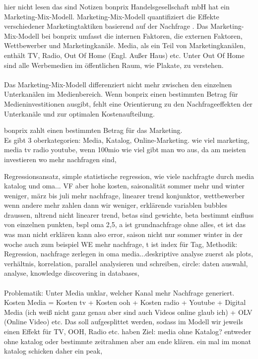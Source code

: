 \iffalse
hier nicht lesen das sind Notizen
bonprix Handelsgesellschaft mbH hat ein Marketing-Mix-Modell. Marketing-Mix-Modell quantifiziert die Effekte verschiedener Marketingtaktiken basierend auf der Nachfrage \cite{MMMdef}. Das Marketing-Mix-Modell bei bonprix umfasst die internen Faktoren, die externen Faktoren, Wettbewerber und Marketingkanäle. Media, als ein Teil von Marketingkanälen, enthält TV, Radio, Out Of Home (Engl. Außer Haus) etc. Unter Out Of Home sind alle Werbemedien im öffentlichen Raum, wie Plakate, zu verstehen. \\\\
Das Marketing-Mix-Modell differenziert nicht mehr zwischen den einzelnen Unterkanälen im Medienbereich. Wenn bonprix einen bestimmten Betrag für Medieninvestitionen ausgibt, fehlt eine Orientierung zu den Nachfrageeffekten der Unterkanäle und zur optimalen Kostenaufteilung.

bonprix zahlt einen bestimmten Betrag für das Marketing. \\ 
Es gibt 3 oberkategorien: Media, Katalog, Online-Marketing. wie viel marketing, media tv radio youtube, wenn 100mio wie viel gibt man wo aus, da am meisten investieren wo mehr nachfragen sind, 

Regressionsansatz, simple statistische regression, wie viele nachfragte durch media katalog und oma... VF aber hohe kosten, saisonalität sommer mehr und winter weniger, märz bis juli mehr nachfrage, linearer trend konjunktor, wettbewerber wenn andere mehr zahlen dann wir weniger, erklärende variablen bubbles draussen, nltrend nicht linearer trend, betas sind gewichte, beta bestimmt einfluss von einzelnen punkten, bspl oma 2,5, a ist grundnachfrage ohne alles, et ist das was man nicht erklären kann also error, saison nicht nur sommer winter in der woche auch zum beispiel WE mehr nachfrage, t ist index für Tag,
Methodik: Regression, nachfrage zerlegen in oma media...deskriptive analyse zuerst als plots, verhältnis, korrelation, parallel analysieren und schreiben, circle: daten auswahl, analyse, knowledge discovering in databases, \\ \\
Problematik: Unter Media unklar, welcher Kanal mehr Nachfrage generiert. Kosten Media = Kosten tv + Kosten ooh + Kosten radio + Youtube + Digital Media (ich weiß nicht ganz genau aber sind auch Videos online glaub ich) + OLV (Online Video) etc.
Das soll aufgesplittet werden, sodass im Modell wir jeweils einen Effekt für TV, OOH, Radio etc. haben
Ziel: media ohne Katalog? entweder ohne katalog oder bestimmte zeitrahmen aber am ende klären.  
ein mal im monat katalog schicken daher ein peak,

